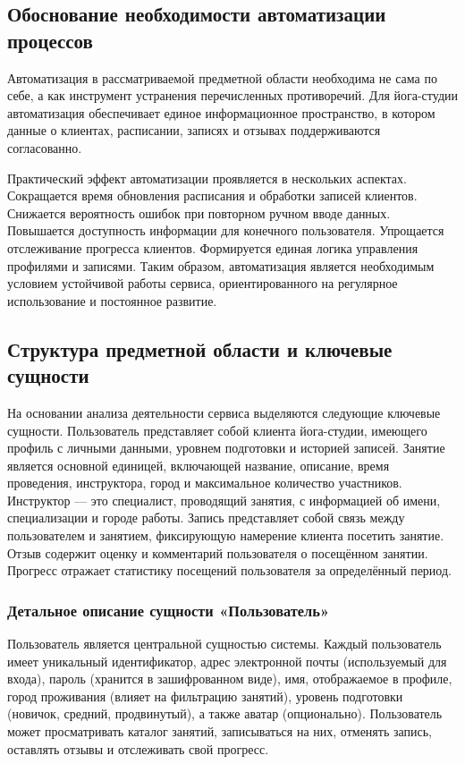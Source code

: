 \subsection{Обоснование необходимости автоматизации процессов}

Автоматизация в рассматриваемой предметной области необходима не сама по себе, а как инструмент устранения перечисленных противоречий. Для йога-студии автоматизация обеспечивает единое информационное пространство, в котором данные о клиентах, расписании, записях и отзывах поддерживаются согласованно.

Практический эффект автоматизации проявляется в нескольких аспектах. Сокращается время обновления расписания и обработки записей клиентов. Снижается вероятность ошибок при повторном ручном вводе данных. Повышается доступность информации для конечного пользователя. Упрощается отслеживание прогресса клиентов. Формируется единая логика управления профилями и записями. Таким образом, автоматизация является необходимым условием устойчивой работы сервиса, ориентированного на регулярное использование и постоянное развитие.

\subsection{Структура предметной области и ключевые сущности}

На основании анализа деятельности сервиса выделяются следующие ключевые сущности. Пользователь представляет собой клиента йога-студии, имеющего профиль с личными данными, уровнем подготовки и историей записей. Занятие является основной единицей, включающей название, описание, время проведения, инструктора, город и максимальное количество участников. Инструктор — это специалист, проводящий занятия, с информацией об имени, специализации и городе работы. Запись представляет собой связь между пользователем и занятием, фиксирующую намерение клиента посетить занятие. Отзыв содержит оценку и комментарий пользователя о посещённом занятии. Прогресс отражает статистику посещений пользователя за определённый период.

\subsubsection{Детальное описание сущности «Пользователь»}

Пользователь является центральной сущностью системы. Каждый пользователь имеет уникальный идентификатор, адрес электронной почты (используемый для входа), пароль (хранится в зашифрованном виде), имя, отображаемое в профиле, город проживания (влияет на фильтрацию занятий), уровень подготовки (новичок, средний, продвинутый), а также аватар (опционально). Пользователь может просматривать каталог занятий, записываться на них, отменять запись, оставлять отзывы и отслеживать свой прогресс.

